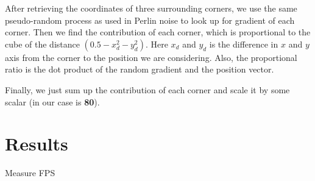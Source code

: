 \documentclass[a4paper,11pt]{article}
\begin{document}
After retrieving the coordinates of three surrounding corners, we use the same pseudo-random process as used in Perlin noise to look up for gradient of each corner. Then we find the contribution of each corner, which is proportional to the cube of the distance $(0.5 - x_d^2 - y_d^2)$. Here $x_d$ and $y_d$ is the difference in $x$ and $y$ axis from the corner to the position we are considering. Also, the proportional ratio is the dot product of the random gradient and the position vector.

Finally, we just sum up the contribution of each corner and scale it by some scalar (in our case is \textbf{80}).



\section{Results}

Measure FPS
\end{document}
